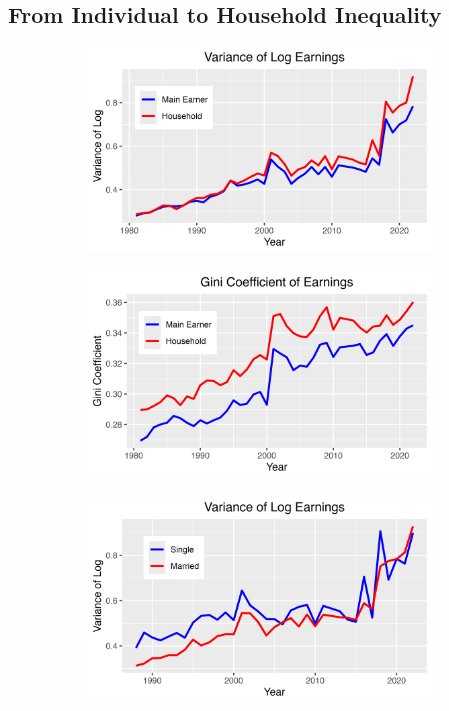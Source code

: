 \documentclass{article}
\begin{document}
\subsection{From Individual to Household Inequality}

\begin{figure}
    \centering
    \begin{subfigure}[t]{0.475\textwidth}
        \centering
        \includegraphics[width=\textwidth]{figures/Fig_3/Fig_3a_Var_indHH.png}
    \end{subfigure}
    \begin{subfigure}[t]{0.475\textwidth}
        \centering
        \includegraphics[width=\textwidth]{figures/Fig_3/Fig_3b_Gini_indHH.png}
    \end{subfigure}
    \begin{subfigure}[t]{0.475\textwidth}
        \centering
        \includegraphics[width=\textwidth]{figures/Fig_3/Fig_3c_Var_single.png}

\end{subfigure}
\end{figure}
\end{document}
